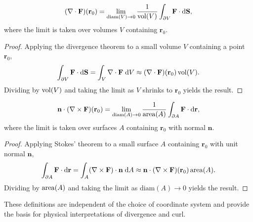 \documentclass[a4paper]{article}
\begin{document}
\begin{prop}
  \[
    (\nabla \cdot \mathbf{F})(\mathbf{r}_0) = \lim_{\mathrm{diam}(V) \to 0} \frac{1}{\operatorname{vol}(V)}\int_{\partial V}\mathbf{F}\cdot \mathrm{d} \mathbf{S},
  \]
  where the limit is taken over volumes $V$ containing $\mathbf{r}_0$.
\end{prop}

\begin{proof}
  Applying the divergence theorem to a small volume $V$ containing a point $\mathbf{r}_0$,
  \[
    \int_{\partial V}\mathbf{F}\cdot \mathrm{d} \mathbf{S} = \int_V\nabla\cdot \mathbf{F}\;\mathrm{d} V\approx (\nabla\cdot \mathbf{F})(\mathbf{r}_0) \operatorname{vol}(V).
  \]
  Dividing by $\operatorname{vol}(V)$ and taking the limit as $V$ shrinks to $\mathbf{r}_0$ yields the result.
\end{proof}

\begin{prop}
  \[
    \mathbf{n}\cdot (\nabla \times \mathbf{F})(\mathbf{r}_0) = \lim_{\mathrm{diam}(A) \to 0}\frac{1}{\operatorname{area}(A)}\int_{\partial A}\mathbf{F}\cdot \mathrm{d} \mathbf{r},
  \]
  where the limit is taken over surfaces $A$ containing $\mathbf{r}_0$ with normal $\mathbf{n}$.
\end{prop}

\begin{proof}
  Applying Stokes' theorem to a small surface $A$ containing $\mathbf{r}_0$ with unit normal $\mathbf{n}$,
  \[
    \int _{\partial A}\mathbf{F}\cdot \mathrm{d} \mathbf{r} = \int_A(\nabla\times \mathbf{F})\cdot \mathbf{n}\;\mathrm{d} A \approx \mathbf{n}\cdot (\nabla\times \mathbf{F})(\mathbf{r}_0) \operatorname{area}(A).
  \]
  Dividing by $\operatorname{area}(A)$ and taking the limit as $\mathrm{diam}(A) \to 0$ yields the result.
\end{proof}

\begin{rmk}
  These definitions are independent of the choice of coordinate system and provide the basis for physical interpretations of divergence and curl.
\end{rmk}
\end{document}
